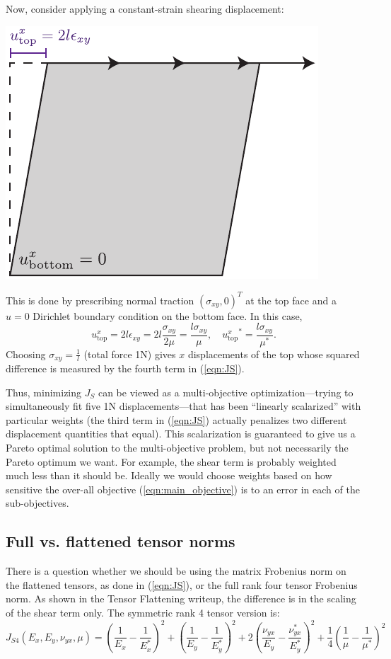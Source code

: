 \documentclass[10pt]{article}
\begin{document}
Now, consider applying a constant-strain shearing displacement:
\\
\begin{minipage}{\linewidth}
    \centering
    \includegraphics[width=.35\textwidth]{shear_load.pdf}
\end{minipage}
This is done by prescribing normal traction $(\sigma_{xy}, 0)^T$ at the top
face and a $u = 0$ Dirichlet boundary condition on the bottom face. In this case, 
$$
u^x_\text{top} = 2 l \epsilon_{xy} = 2 l \frac{\sigma_{xy}}{2 \mu} = \frac{l \sigma_{xy}}{\mu},\quad
{u^x_\text{top}}^* = \frac{l \sigma_{xy}}{\mu^*}.
$$
Choosing $\sigma_{xy} = \frac{1}{l}$ (total force 1N) gives $x$ displacements
of the top whose squared difference is measured by the fourth term in (\ref{eqn:JS}).

Thus, minimizing $J_S$ can be viewed as a multi-objective optimization---trying
to simultaneously fit five 1N displacements---that has been ``linearly
scalarized'' with particular weights (the third term in (\ref{eqn:JS}) actually
penalizes two different displacement quantities that equal). This scalarization
is guaranteed to give us a Pareto optimal solution to the multi-objective
problem, but not necessarily the Pareto optimum we want. For example, the shear
term is probably weighted much less than it should be. Ideally we would
choose weights based on how sensitive the over-all objective
(\ref{eqn:main_objective}) is to an error in each of the sub-objectives.

\subsection{Full vs. flattened tensor norms}
There is a question whether we should be using the matrix Frobenius norm on the
flattened tensors, as done in (\ref{eqn:JS}), or the full rank four tensor
Frobenius norm. As shown in the Tensor Flattening writeup, the difference is in
the scaling of the shear term only. The symmetric rank 4 tensor version is:
\begin{equation}
    \label{eqn:JS4}
J_{S4}(E_x, E_y, \nu_{yx}, \mu) = 
\left(\frac{1}{E_x} - \frac{1}{E_x^*}\right)^2 +
\left(\frac{1}{E_y} - \frac{1}{E_y^*}\right)^2 +
2 \left(\frac{\nu_{yx}}{E_y} - \frac{\nu_{yx}^*}{E_y^*}\right)^2 +
\frac{1}{4} \left(\frac{1}{\mu} - \frac{1}{\mu^*}\right)^2
\end{equation}
\end{document}
